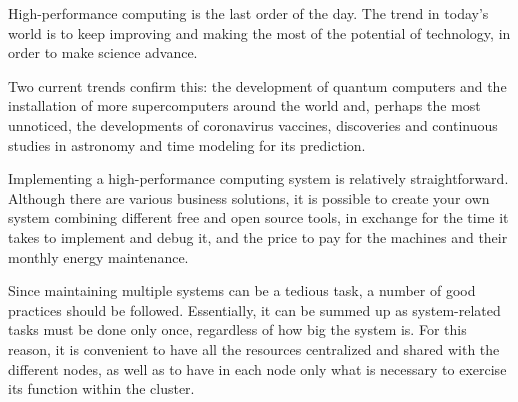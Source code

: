High-performance computing is the last order of the day. The trend in today's world is to keep improving and making the most of the potential of technology, in order to make science advance.
\vspace{2 mm}

Two current trends confirm this: the development of quantum computers and the installation of more supercomputers around the world and, perhaps the most unnoticed, the developments of coronavirus vaccines, discoveries and continuous studies in astronomy and time modeling for its prediction.
\vspace{2mm}

Implementing a high-performance computing system is relatively straightforward. Although there are various business solutions, it is possible to create your own system combining different free and open source tools, in exchange for the time it takes to implement and debug it, and the price to pay for the machines and their monthly energy maintenance.
\vspace{2mm}

Since maintaining multiple systems can be a tedious task, a number of good practices should be followed. Essentially, it can be summed up as system-related tasks must be done only once, regardless of how big the system is. For this reason, it is convenient to have all the resources centralized and shared with the different nodes, as well as to have in each node only what is necessary to exercise its function within the cluster.